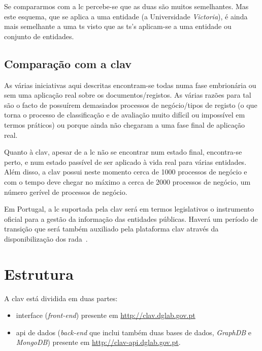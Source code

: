 Se compararmos com a \acrshort{lc} percebe-se que as duas são muitos semelhantes. Mas este esquema, que se aplica a uma entidade (a Universidade \textit{Victoria}), é ainda mais semelhante a uma \acrshort{ts} visto que as \acrshort{ts}'s aplicam-se a uma entidade ou conjunto de entidades.

\subsection{Comparação com a \acrshort{clav}}

As várias iniciativas aqui descritas encontram-se todas numa fase embrionária ou sem uma aplicação real sobre os documentos/registos. As várias razões para tal são o facto de possuírem demasiados processos de negócio/tipos de registo (o que torna o processo de classificação e de avaliação muito difícil ou impossível em termos práticos) ou porque ainda não chegaram a uma fase final de aplicação real.

Quanto à \acrshort{clav}, apesar de a \acrshort{lc} não se encontrar num estado final, encontra-se perto, e num estado passível de ser aplicado à vida real para várias entidades. Além disso, a \acrshort{clav} possui neste momento cerca de 1000 processos de negócio e com o tempo deve chegar no máximo a cerca de 2000 processos de negócio, um número gerível de processos de negócio.

Em Portugal, a \acrshort{lc} suportada pela \acrshort{clav} será em termos legislativos o instrumento oficial para a gestão da informação das entidades públicas. Haverá um período de transição que será também auxiliado pela plataforma \acrshort{clav} através da disponibilização dos \acrshort{rada}~\cite{rada}.

\section{Estrutura}
A \acrshort{clav} está dividida em duas partes:
\begin{itemize}
    \item interface (\textit{front-end}) presente em \url{http://clav.dglab.gov.pt}
    \item \acrshort{api} de dados (\textit{back-end} que inclui também duas bases de dados, \textit{GraphDB} e \textit{MongoDB}) presente em \url{http://clav-api.dglab.gov.pt}.
\end{itemize}

